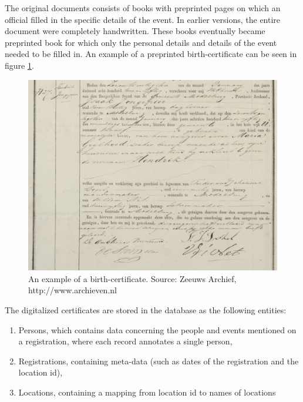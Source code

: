 The original documents consists of books with preprinted pages on which an official filled in the specific details of the event. In earlier versions, the entire document were completely handwritten. These books eventually became preprinted book for which only the personal details and details of the event needed to be filled in. An example of a preprinted birth-certificate can be seen in figure \ref{fig:birth_certificate_example}. 



\begin{figure}
	\caption{An example of a birth-certificate. Source: Zeeuws Archief, http://www.archieven.nl}
	\begin{center}
		\includegraphics[scale=0.4]{figures/middelburg-gb_1853.jpg}
	\end{center}
	\label{fig:birth_certificate_example}
\end{figure}


The digitalized certificates are stored in the database as the following entities:
\begin{enumerate}
	\item Persons, which contains data concerning the people and events mentioned on a registration, where each record annotates a single person,
	\item Registrations, containing meta-data (such as dates of the registration and the location id),
	\item Locations, containing a mapping from location id to names of locations
\end{enumerate}

